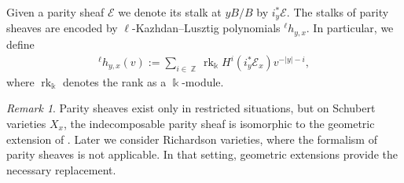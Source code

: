 \documentclass[11pt]{article}
\DeclareMathOperator{\Z}{\mathbb{Z}}
\DeclareMathOperator{\rank}{rk}
\theoremstyle{remark}
\newtheorem{rem}[thm]{Remark}
\theoremstyle{definition}
\begin{document}
	Given a parity sheaf $\mathscr{E}$ we denote its stalk at $yB/B$ by $i_y^*\mathscr{E}$.
	The stalks of parity sheaves are encoded by $\ell$-Kazhdan--Lusztig polynomials ${}^{\ell} h_{y,x}$.
	In particular, we define
	\begin{align}
\label{Eqn: lKL polynomials}
		{}^{\ell} h_{y,x}(v) 
		:=
		\sum_{i \in \Z}  \rank_{\Bbbk} H^{i} (i_y^*\mathscr{E}_{x}) v^{-|y| - i},
	\end{align}
	where $\rank_{\Bbbk}$ denotes the rank as a $\Bbbk$-module. 
    \begin{rem}
     Parity sheaves exist only in restricted situations, but on Schubert varieties $X_x$, the indecomposable parity sheaf is isomorphic to the geometric extension of \cite{HW23}. Later we consider Richardson varieties, where the formalism of parity sheaves is not applicable. 
    In that setting, geometric extensions provide the necessary replacement.
    \end{rem}
\end{document}
